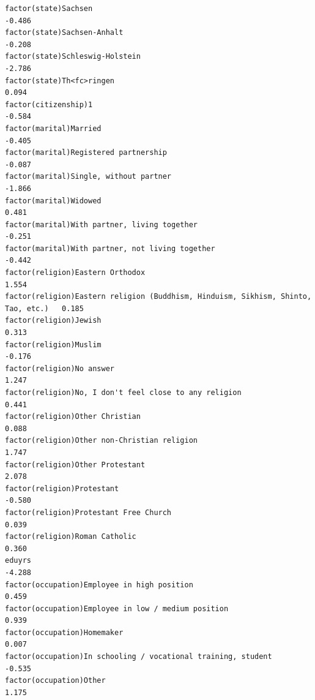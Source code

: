 \documentclass[
]{article}
\begin{document}
\begin{table}
\begin{minipage}[t]{\linewidth}
{\begin{verbatim}
factor(state)Sachsen                                                               -0.486
factor(state)Sachsen-Anhalt                                                        -0.208
factor(state)Schleswig-Holstein                                                    -2.786
factor(state)Th<fc>ringen                                                           0.094
factor(citizenship)1                                                               -0.584
factor(marital)Married                                                             -0.405
factor(marital)Registered partnership                                              -0.087
factor(marital)Single, without partner                                             -1.866
factor(marital)Widowed                                                              0.481
factor(marital)With partner, living together                                       -0.251
factor(marital)With partner, not living together                                   -0.442
factor(religion)Eastern Orthodox                                                    1.554
factor(religion)Eastern religion (Buddhism, Hinduism, Sikhism, Shinto, Tao, etc.)   0.185
factor(religion)Jewish                                                              0.313
factor(religion)Muslim                                                             -0.176
factor(religion)No answer                                                           1.247
factor(religion)No, I don't feel close to any religion                              0.441
factor(religion)Other Christian                                                     0.088
factor(religion)Other non-Christian religion                                        1.747
factor(religion)Other Protestant                                                    2.078
factor(religion)Protestant                                                         -0.580
factor(religion)Protestant Free Church                                              0.039
factor(religion)Roman Catholic                                                      0.360
eduyrs                                                                             -4.288
factor(occupation)Employee in high position                                         0.459
factor(occupation)Employee in low / medium position                                 0.939
factor(occupation)Homemaker                                                         0.007
factor(occupation)In schooling / vocational training, student                      -0.535
factor(occupation)Other                                                             1.175

\end{verbatim}}
\end{minipage}
\end{table}
\end{document}
